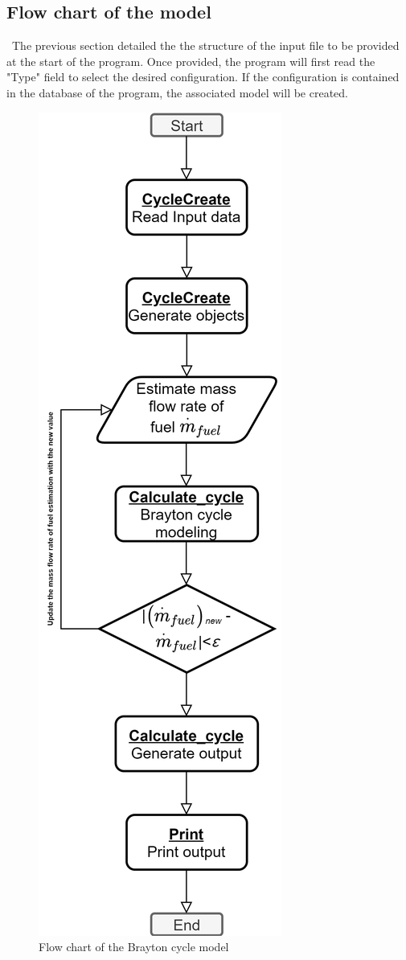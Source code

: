 \subsection{Flow chart of the model}
\quad\,  The previous section detailed the the structure of the input file to be provided at the start of the program. Once provided, the program will first read the "Type" field to select the desired configuration. If the configuration is contained in the database of the program, the associated model will be created.
\begin{figure}
\centering
\includegraphics{Flow_chart.png}
\caption{Flow chart of the Brayton cycle model}
\label{fig:C6_flowchart}
\end{figure}
